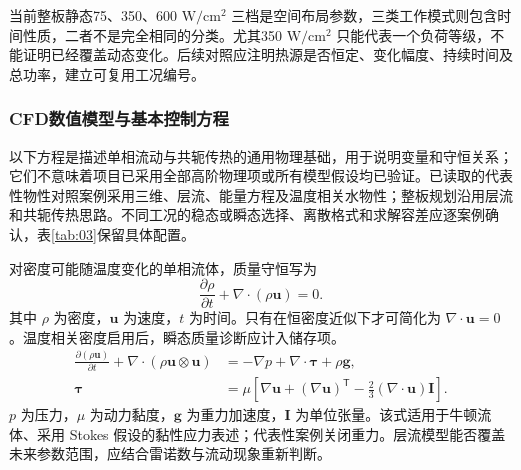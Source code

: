 \documentclass[UTF8]{midterm}
\begin{document}
当前整板静态75、350、600 $\mathrm{W/cm^2}$ 三档是空间布局参数，三类工作模式则包含时间性质，二者不是完全相同的分类。尤其350 $\mathrm{W/cm^2}$ 只能代表一个负荷等级，不能证明已经覆盖动态变化。后续对照应注明热源是否恒定、变化幅度、持续时间及总功率，建立可复用工况编号。

\subsubsection{CFD数值模型与基本控制方程}
以下方程是描述单相流动与共轭传热的通用物理基础，用于说明变量和守恒关系；它们不意味着项目已采用全部高阶物理项或所有模型假设均已验证。已读取的代表性物性对照案例采用三维、层流、能量方程及温度相关水物性；整板规划沿用层流和共轭传热思路。不同工况的稳态或瞬态选择、离散格式和求解容差应逐案例确认，表\ref{tab:03}保留具体配置。

对密度可能随温度变化的单相流体，质量守恒写为
\begin{equation}\frac{\partial\rho}{\partial t}+\nabla\cdot(\rho\bm u)=0.\label{eq:mass}\end{equation}
其中 $\rho$ 为密度，$\bm u$ 为速度，$t$ 为时间。只有在恒密度近似下才可简化为 $\nabla\cdot\bm u=0$。温度相关密度启用后，瞬态质量诊断应计入储存项。
\begin{equation}\begin{aligned}
\frac{\partial(\rho\bm u)}{\partial t}+\nabla\cdot(\rho\bm u\otimes\bm u)
&=-\nabla p+\nabla\cdot\bm\tau+\rho\bm g,\\
\bm\tau&=\mu\left[\nabla\bm u+(\nabla\bm u)^{\mathsf T}-\frac23(\nabla\cdot\bm u)\bm I\right].
\end{aligned}\label{eq:momentum}
\end{equation}
$p$ 为压力，$\mu$ 为动力黏度，$\bm g$ 为重力加速度，$\bm I$ 为单位张量。该式适用于牛顿流体、采用 Stokes 假设的黏性应力表述；代表性案例关闭重力。层流模型能否覆盖未来参数范围，应结合雷诺数与流动现象重新判断。
\end{document}
